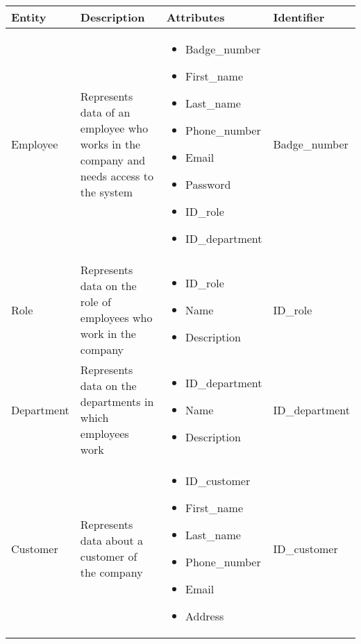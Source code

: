 \begin{longtable}{|p{}|p{} |p{}|p{} |} 
\hline
\textbf{Entity} & \textbf{Description} & \textbf{Attributes} & \textbf{Identifier}  \\\hline

Employee & Represents data of an employee who works in the company and needs access to the system &
    \begin{itemize}
        \vspace{-1em}
        \item Badge_number
        \item First_name
        \item Last_name
        \item Phone_number
        \item Email
        \item Password
        \item ID_role
        \item ID_department
    \end{itemize}
&  Badge_number\\\hline

Role & Represents data on the role of employees who work in the company &
    \begin{itemize}
        \vspace{-1em}
        \item ID_role
        \item Name
        \item Description
    \end{itemize}
&  ID_role\\\hline

Department & Represents data on the departments in which employees work &
    \begin{itemize}
        \vspace{-1em}
        \item ID_department
        \item Name
        \item Description
    \end{itemize}
&  ID_department\\\hline

Customer & Represents data about a customer of the company &
    \begin{itemize}
        \vspace{-1em}
        \item ID_customer
        \item First_name
        \item Last_name
        \item Phone_number
        \item Email
        \item Address
    \end{itemize}
&  ID_customer\\\hline


\end{longtable}
